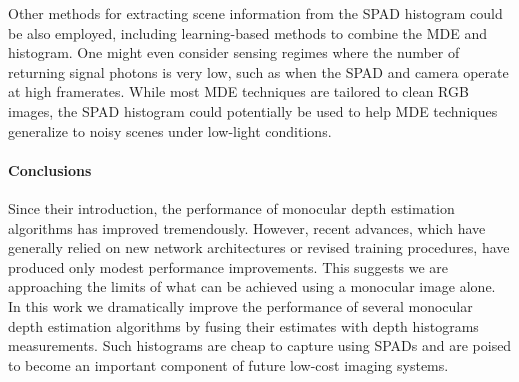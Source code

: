 Other methods for extracting scene information from the SPAD histogram could be
also employed, including learning-based methods to combine the MDE and
histogram. One might even consider sensing regimes where the number of
returning signal photons is very low, such as when the SPAD and camera operate
at high framerates. While most MDE techniques are tailored to clean RGB images,  
the SPAD histogram could potentially be used to help MDE
techniques generalize to noisy scenes under low-light conditions. 
 


\paragraph{Conclusions}
Since their introduction, the performance of monocular depth estimation algorithms has improved tremendously.  However, recent advances, which have generally relied on new network architectures or revised training procedures, have produced only modest performance improvements. 
This suggests we are approaching the limits of what can be achieved using a monocular image alone. 
In this work we dramatically improve the performance of several monocular depth estimation algorithms by fusing their estimates with depth histograms measurements. 
Such histograms are cheap to capture using SPADs and are poised to become an important component of future low-cost imaging systems.
 
